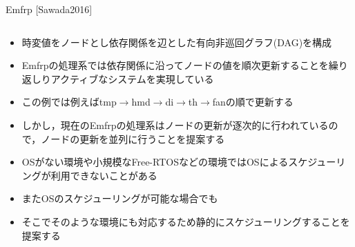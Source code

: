 \documentclass[dvipdfmx,final,t,12pt]{beamer}
\begin{document}
\begin{frame}[fragile]
    \begin{block}{Emfrp \small{[Sawada2016]}}
        \begin{columns}
            \begin{column}{0.45\textwidth}
                \begin{itemize}
                    \item 時変値をノードとし依存関係を辺とした有向非巡回グラフ(DAG)を構成
                    \item Emfrpの処理系では依存関係に沿ってノードの値を順次更新することを繰り返しりアクティブなシステムを実現している
                    \item この例では例えばtmp$\rightarrow$hmd$\rightarrow$di$\rightarrow$th$\rightarrow$fanの順で更新する
                    \item しかし，現在のEmfrpの処理系はノードの更新が逐次的に行われているので，ノードの更新を並列に行うことを提案する
                    \item OSがない環境や小規模なFree-RTOSなどの環境ではOSによるスケジューリングが利用できないことがある
                    \item またOSのスケジューリングが可能な場合でも
                    \item そこでそのような環境にも対応するため静的にスケジューリングすることを提案する
                \end{itemize}
            \end{column}
        \end{columns}
    \end{block}


\end{frame}
\end{document}
